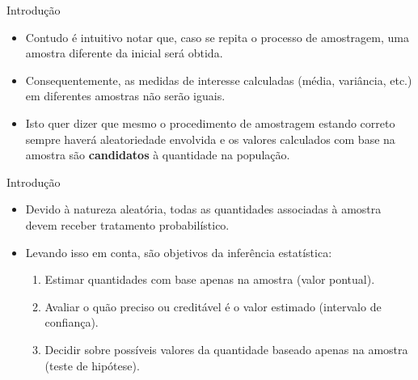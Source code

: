 \documentclass[
  ignorenonframetext,
  serif,
  professionalfont,
  usenames,
  dvipsnames,
  aspectratio = 169]{beamer}
\providecommand{\tightlist}{%
  \setlength{\itemsep}{0pt}\setlength{\parskip}{0pt}}
\renewcommand{\tightlist}{%
  \setlength{\itemsep}{0\baselineskip}
  \setlength{\parskip}{0.25\baselineskip}
}
\begin{document}
\begin{frame}{Introdução}
\protect\hypertarget{introduuxe7uxe3o-2}{}
\begin{itemize}
\tightlist
\item
  Contudo é intuitivo notar que, caso se repita o processo de
  amostragem, uma amostra diferente da inicial será obtida.
\end{itemize}

\vspace{0.3cm}

\begin{itemize}
\tightlist
\item
  Consequentemente, as medidas de interesse calculadas (média,
  variância, etc.) em diferentes amostras não serão iguais.
\end{itemize}

\vspace{0.3cm}

\begin{itemize}
\tightlist
\item
  Isto quer dizer que mesmo o procedimento de amostragem estando correto
  sempre haverá aleatoriedade envolvida e os valores calculados com base
  na amostra são \textbf{candidatos} à quantidade na população.
\end{itemize}
\end{frame}

\begin{frame}{Introdução}
\protect\hypertarget{introduuxe7uxe3o-3}{}
\begin{itemize}
\tightlist
\item
  Devido à natureza aleatória, todas as quantidades associadas à amostra
  devem receber tratamento probabilístico.
\end{itemize}

\vspace{0.3cm}

\begin{itemize}
\tightlist
\item
  Levando isso em conta, são objetivos da inferência estatística:

  \begin{enumerate}
  \tightlist
  \item
    Estimar quantidades com base apenas na amostra (valor pontual).
  \item
    Avaliar o quão preciso ou creditável é o valor estimado (intervalo
    de confiança).
  \item
    Decidir sobre possíveis valores da quantidade baseado apenas na
    amostra (teste de hipótese).
  \end{enumerate}
\end{itemize}
\end{frame}
\end{document}
